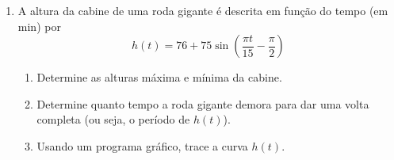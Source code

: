 \begin{enumerate}
\begin{enumerate}
        \item $2 \cos^2(x)-\cos(x)=0$
        \item $\tan^2(x)= \sqrt{3} \tan(x)$
        \item $\tan^2(x)=1$
        \item $7\sin(x)+4=2\sin^2(x)$
    \end{enumerate}
    \item A altura da cabine de uma roda gigante é descrita em função do tempo (em min) por
$$h(t)=76+75 \sin \left( \frac{\pi t}{15}- \frac{\pi}{2}\right)$$
\begin{enumerate}
    \item Determine as alturas máxima e mínima da cabine.
    \item Determine quanto tempo a roda gigante demora para dar uma volta completa (ou seja, o período de $h(t)$).
    \item Usando um programa gráfico, trace a curva $h(t)$.
\end{enumerate}
\end{enumerate}